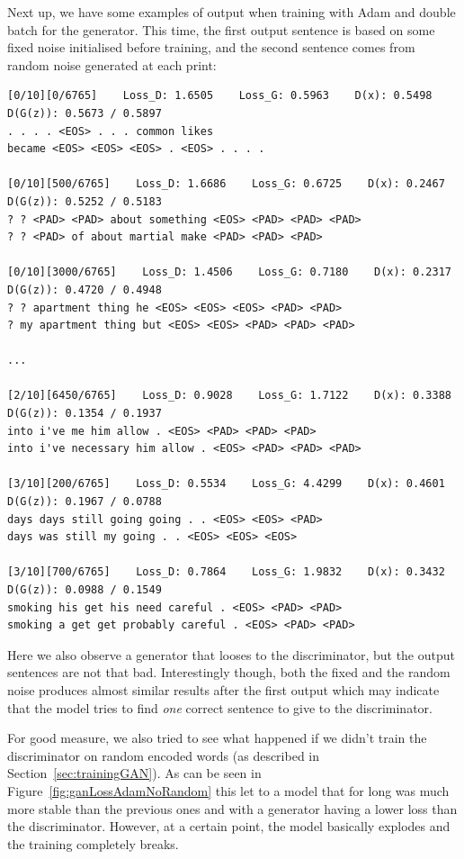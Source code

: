 \documentclass{article}
\begin{document}
Next up, we have some examples of output when training with Adam and double
batch for the generator. This time, the first output sentence is based on some
fixed noise initialised before training, and the second sentence comes from
random noise generated at each print:

\begin{verbatim}
[0/10][0/6765]    Loss_D: 1.6505    Loss_G: 0.5963    D(x): 0.5498    D(G(z)): 0.5673 / 0.5897
. . . . <EOS> . . . common likes
became <EOS> <EOS> <EOS> . <EOS> . . . .

[0/10][500/6765]    Loss_D: 1.6686    Loss_G: 0.6725    D(x): 0.2467    D(G(z)): 0.5252 / 0.5183
? ? <PAD> <PAD> about something <EOS> <PAD> <PAD> <PAD>
? ? <PAD> of about martial make <PAD> <PAD> <PAD>

[0/10][3000/6765]    Loss_D: 1.4506    Loss_G: 0.7180    D(x): 0.2317    D(G(z)): 0.4720 / 0.4948
? ? apartment thing he <EOS> <EOS> <EOS> <PAD> <PAD>
? my apartment thing but <EOS> <EOS> <PAD> <PAD> <PAD>

...

[2/10][6450/6765]    Loss_D: 0.9028    Loss_G: 1.7122    D(x): 0.3388    D(G(z)): 0.1354 / 0.1937
into i've me him allow . <EOS> <PAD> <PAD> <PAD>
into i've necessary him allow . <EOS> <PAD> <PAD> <PAD>

[3/10][200/6765]    Loss_D: 0.5534    Loss_G: 4.4299    D(x): 0.4601    D(G(z)): 0.1967 / 0.0788
days days still going going . . <EOS> <EOS> <PAD>
days was still my going . . <EOS> <EOS> <EOS>

[3/10][700/6765]    Loss_D: 0.7864    Loss_G: 1.9832    D(x): 0.3432    D(G(z)): 0.0988 / 0.1549
smoking his get his need careful . <EOS> <PAD> <PAD>
smoking a get get probably careful . <EOS> <PAD> <PAD>
\end{verbatim}

Here we also observe a generator that looses to the discriminator, but the
output sentences are not that bad. Interestingly though, both the fixed and the
random noise produces almost similar results after the first output which may
indicate that the model tries to find \textit{one} correct sentence to give to
the discriminator.

For good measure, we also tried to see what happened if we didn't train the
discriminator on random encoded words (as described in
Section~\ref{sec:trainingGAN}). As can be seen in
Figure~\ref{fig:ganLossAdamNoRandom} this let to a model that for long was much
more stable than the previous ones and with a generator having a lower loss than
the discriminator. However, at a certain point, the model basically explodes and
the training completely breaks.
\end{document}
